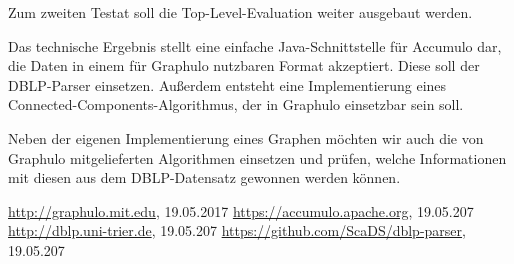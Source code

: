 \documentclass{article}
\begin{document}
Zum zweiten Testat soll die Top-Level-Evaluation weiter ausgebaut werden. 

Das technische Ergebnis stellt eine einfache Java-Schnittstelle für Accumulo dar, die Daten in einem für Graphulo nutzbaren Format akzeptiert. Diese soll der DBLP-Parser einsetzen. Außerdem entsteht eine Implementierung eines Connected-Components-Algorithmus, der in Graphulo einsetzbar sein soll.

Neben der eigenen Implementierung eines Graphen möchten wir auch die von Graphulo mitgelieferten Algorithmen einsetzen und prüfen, welche Informationen mit diesen aus dem DBLP-Datensatz gewonnen werden können.


\begin{thebibliography}{laengste Labelbreite}
	 \url{http://graphulo.mit.edu}, 19.05.2017
	 \url{https://accumulo.apache.org}, 19.05.207
	 \url{http://dblp.uni-trier.de}, 19.05.207
	 \url{https://github.com/ScaDS/dblp-parser}, 19.05.207
\end{thebibliography}
\end{document}
